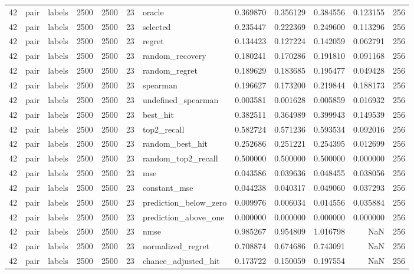 \begin{tabular}{rllrrrlrrrrr}
42 & pair & labels & 2500 & 2500 & 23 & oracle & 0.369870 & 0.356129 & 0.384556 & 0.123155 & 256 \\
42 & pair & labels & 2500 & 2500 & 23 & selected & 0.235447 & 0.222369 & 0.249600 & 0.113296 & 256 \\
42 & pair & labels & 2500 & 2500 & 23 & regret & 0.134423 & 0.127224 & 0.142059 & 0.062791 & 256 \\
42 & pair & labels & 2500 & 2500 & 23 & random_recovery & 0.180241 & 0.170286 & 0.191810 & 0.091168 & 256 \\
42 & pair & labels & 2500 & 2500 & 23 & random_regret & 0.189629 & 0.183685 & 0.195477 & 0.049428 & 256 \\
42 & pair & labels & 2500 & 2500 & 23 & spearman & 0.196627 & 0.173200 & 0.219844 & 0.188173 & 256 \\
42 & pair & labels & 2500 & 2500 & 23 & undefined_spearman & 0.003581 & 0.001628 & 0.005859 & 0.016932 & 256 \\
42 & pair & labels & 2500 & 2500 & 23 & best_hit & 0.382511 & 0.364989 & 0.399943 & 0.149539 & 256 \\
42 & pair & labels & 2500 & 2500 & 23 & top2_recall & 0.582724 & 0.571236 & 0.593534 & 0.092016 & 256 \\
42 & pair & labels & 2500 & 2500 & 23 & random_best_hit & 0.252686 & 0.251221 & 0.254395 & 0.012699 & 256 \\
42 & pair & labels & 2500 & 2500 & 23 & random_top2_recall & 0.500000 & 0.500000 & 0.500000 & 0.000000 & 256 \\
42 & pair & labels & 2500 & 2500 & 23 & mse & 0.043586 & 0.039636 & 0.048455 & 0.038056 & 256 \\
42 & pair & labels & 2500 & 2500 & 23 & constant_mse & 0.044238 & 0.040317 & 0.049060 & 0.037293 & 256 \\
42 & pair & labels & 2500 & 2500 & 23 & prediction_below_zero & 0.009976 & 0.006034 & 0.014556 & 0.035884 & 256 \\
42 & pair & labels & 2500 & 2500 & 23 & prediction_above_one & 0.000000 & 0.000000 & 0.000000 & 0.000000 & 256 \\
42 & pair & labels & 2500 & 2500 & 23 & nmse & 0.985267 & 0.954809 & 1.016798 & NaN & 256 \\
42 & pair & labels & 2500 & 2500 & 23 & normalized_regret & 0.708874 & 0.674686 & 0.743091 & NaN & 256 \\
42 & pair & labels & 2500 & 2500 & 23 & chance_adjusted_hit & 0.173722 & 0.150059 & 0.197554 & NaN & 256 \\

\end{tabular}
